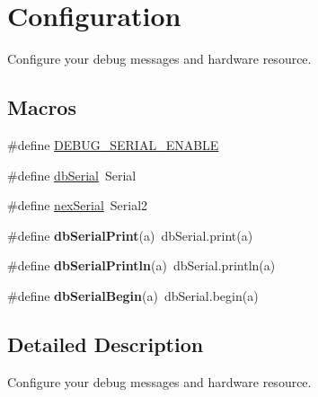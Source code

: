 \hypertarget{group___configuration}{\section{Configuration}
\label{group___configuration}
}


Configure your debug messages and hardware resource.  


\subsection*{Macros}
\begin{DoxyCompactItemize}
\item 
\#define \hyperlink{group___configuration_ga9b3a5e4cc28fc65f02c9b197e8a4c955}{D\+E\+B\+U\+G\+\_\+\+S\+E\+R\+I\+A\+L\+\_\+\+E\+N\+A\+B\+L\+E}
\item 
\#define \hyperlink{group___configuration_ga9abc2a70f2ba1b5a4edc63e807ee172e}{db\+Serial}~Serial
\item 
\#define \hyperlink{group___configuration_ga2738b05a77cd5052e440af5b00b0ecbd}{nex\+Serial}~Serial2
\item 
\hypertarget{group___configuration_gaf018322c574c0f39d5feb76995cdf2d6}{\#define {\bfseries db\+Serial\+Print}(a)~db\+Serial.\+print(a)}\label{group___configuration_gaf018322c574c0f39d5feb76995cdf2d6}

\item 
\hypertarget{group___configuration_ga7792c838c043fae9a630823f1c328a30}{\#define {\bfseries db\+Serial\+Println}(a)~db\+Serial.\+println(a)}\label{group___configuration_ga7792c838c043fae9a630823f1c328a30}

\item 
\hypertarget{group___configuration_gabec12d271fea8fd82696961bc9339edf}{\#define {\bfseries db\+Serial\+Begin}(a)~db\+Serial.\+begin(a)}\label{group___configuration_gabec12d271fea8fd82696961bc9339edf}

\end{DoxyCompactItemize}


\subsection{Detailed Description}
Configure your debug messages and hardware resource. 



